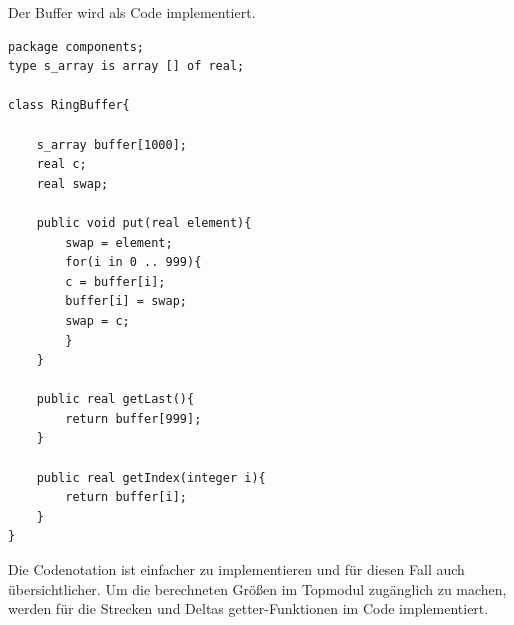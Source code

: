 Der Buffer wird als Code implementiert.
\begin{lstlisting}
package components;
type s_array is array [] of real;

class RingBuffer{

	s_array buffer[1000];    
	real c;
	real swap;
	
	public void put(real element){
		swap = element;
		for(i in 0 .. 999){
		c = buffer[i];
		buffer[i] = swap;
		swap = c;
		}
	}
	
	public real getLast(){
		return buffer[999];
	}
	
	public real getIndex(integer i){
		return buffer[i];
	}
}
\end{lstlisting}
Die Codenotation ist einfacher zu implementieren und für diesen Fall auch übersichtlicher.
Um die berechneten Größen im Topmodul zugänglich zu machen, werden für die Strecken und Deltas getter-Funktionen im Code implementiert.

